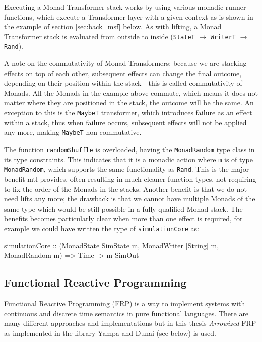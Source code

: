 Executing a Monad Transformer stack works by using various monadic runner functions, which execute a Transformer layer with a given context as is shown in the example of section \ref{sec:back_msf} below. As with lifting, a Monad Transformer stack is evaluated from outside to inside (\texttt{StateT} $\rightarrow$ \texttt{WriterT} $\rightarrow$ \texttt{Rand}).

A note on the commutativity of Monad Transformers: because we are stacking effects on top of each other, subsequent effects can change the final outcome, depending on their position within the stack - this is called commutativity of Monads. All the Monads in the example above commute, which means it does not matter where they are positioned in the stack, the outcome will be the same. An exception to this is the \texttt{MaybeT} transformer, which introduces failure as an effect within a stack, thus when failure occurs, subsequent effects will not be applied any more, making \texttt{MaybeT} non-commutative.

The function \texttt{randomShuffle} is overloaded, having the \texttt{MonadRandom} type class in its type constraints. This indicates that it is a monadic action where \texttt{m} is of type \texttt{MonadRandom}, which supports the same functionality as \texttt{Rand}. This is the major benefit mtl provides, often resulting in much cleaner function types, not requiring to fix the order of the Monads in the stacks. Another benefit is that we do not need lifts any more; the drawback is that we cannot have multiple Monads of the same type which would be still possible in a fully qualified Monad stack. The benefits becomes particularly clear when more than one effect is required, for example we could have written the type of \texttt{simulationCore} as:

\begin{HaskellCode}
simulationCore :: (MonadState SimState m, MonadWriter [String] m, MonadRandom m) 
               => Time -> m SimOut
\end{HaskellCode}

\subsection{Functional Reactive Programming}
\label{sec:back_frp}
Functional Reactive Programming (FRP) is a way to implement systems with continuous and discrete time semantics in pure functional languages. There are many different approaches and implementations but in this thesis \textit{Arrowized} FRP \cite{hughes_generalising_2000, hughes_programming_2005} as implemented in the library Yampa \cite{courtney_yampa_2003,hudak_arrows_2003,nilsson_functional_2002} and Dunai \cite{perez_functional_2016} (see below) is used.

